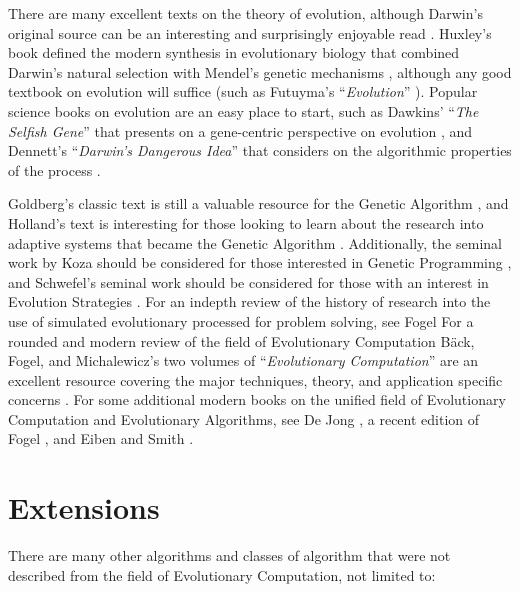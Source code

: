 \begin{bibunit}
There are many excellent texts on the theory of evolution, although Darwin's original source can be an interesting and surprisingly enjoyable read \cite{Darwin1859}. Huxley's book defined the modern synthesis in evolutionary biology that combined Darwin's natural selection with Mendel's genetic mechanisms \cite{Huxley1942}, although any good textbook on evolution will suffice (such as Futuyma's ``\emph{Evolution}'' \cite{Futuyma2009}). Popular science books on evolution are an easy place to start, such as Dawkins' ``\emph{The Selfish Gene}'' that presents on a gene-centric perspective on evolution \cite{Dawkins1976}, and Dennett's ``\emph{Darwin's Dangerous Idea}'' that considers on the algorithmic properties of the process \cite{Dennett1995}.

Goldberg's classic text is still a valuable resource for the Genetic Algorithm \cite{Goldberg1989}, and Holland's text is interesting for those looking to learn about the research into adaptive systems that became the Genetic Algorithm \cite{Holland1975}. Additionally, the seminal work by Koza should be considered for those interested in Genetic Programming \cite{Koza1992}, and Schwefel's seminal work should be considered for those with an interest in Evolution Strategies \cite{Schwefel1981}. For an indepth review of the history of research into the use of simulated evolutionary processed for problem solving, see Fogel \cite{Fogel1998}
For a rounded and modern review of the field of Evolutionary Computation B\"ack, Fogel, and Michalewicz's two volumes of ``\emph{Evolutionary Computation}'' are an excellent resource covering the major techniques, theory, and application specific concerns \cite{Baeck2000, Baeck2000a}.
For some additional modern books on the unified field of Evolutionary Computation and Evolutionary Algorithms, see De Jong \cite{Jong2006}, a recent edition of Fogel \cite{Fogel1995}, and Eiben and Smith \cite{Eiben2003}.

% 
% 
\section{Extensions}
There are many other algorithms and classes of algorithm that were not described from the field of Evolutionary Computation, not limited to:


\end{bibunit}
